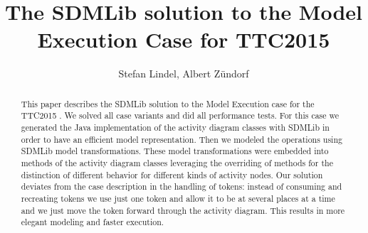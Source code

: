 \documentclass[submission,copyright,creativecommons]{eptcs}
\begin{document}





\pagestyle{headings}

\title{The SDMLib solution to the Model Execution Case for TTC2015} 
\author{Stefan Lindel, Albert Z{\"u}ndorf
}

\def\authorrunning{ Albert Z{\"u}ndorf}
\def\titlerunning{The SDMLib solution to the Model Execution Case for TTC2015}

\maketitle

\begin{abstract}

This paper describes the SDMLib solution to the Model Execution case for the TTC2015 
\cite{ttc2015-model_execution}. We solved all case variants and did all performance tests. 
For this case we generated the Java implementation of the activity diagram classes
with SDMLib in order to have an efficient model representation. Then we modeled the operations 
using SDMLib model transformations. These model transformations were embedded into methods of
the activity diagram classes leveraging the overriding of methods for the distinction of 
different behavior for different kinds of activity nodes. Our solution deviates from the 
case description in the handling of tokens: instead of consuming and recreating tokens we use
just one token and allow it to be at several places at a time and we just move the token forward 
through the activity diagram. This results in more elegant modeling and faster execution. 
  
\end{abstract}
\end{document}
